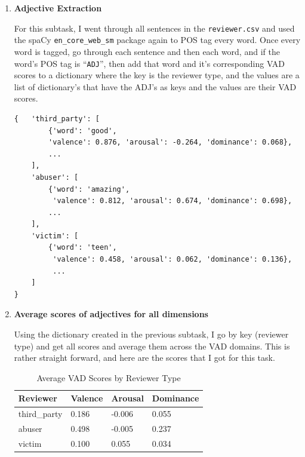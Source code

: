 \documentclass[12pt]{article}
\begin{document}
\begin{enumerate}
    \item \textbf{Adjective Extraction}
    
    For this subtask, I went through all sentences in the \texttt{reviewer.csv} and used the spaCy 
    \texttt{en\_core\_web\_sm} package again to POS tag every word. Once every word is tagged, go through each 
    sentence and then each word, and if the word's POS tag is ``\texttt{ADJ}'', then add that word and it's 
    corresponding VAD scores to a dictionary where the key is the reviewer type, and the 
    values are a list of dictionary's that have the ADJ's as keys and the values are their VAD scores.

\begin{lstlisting}
{   'third_party': [
        {'word': 'good', 
        'valence': 0.876, 'arousal': -0.264, 'dominance': 0.068},
        ...
    ],
    'abuser': [
        {'word': 'amazing',
         'valence': 0.812, 'arousal': 0.674, 'dominance': 0.698}, 
        ...
    ],
    'victim': [
        {'word': 'teen',
         'valence': 0.458, 'arousal': 0.062, 'dominance': 0.136}, 
         ...
    ]
}
\end{lstlisting}

    \item \textbf{Average scores of adjectives for all dimensions}
    
    Using the dictionary created in the previous subtask, I go by key (reviewer type) and get all scores and average them
    across the VAD domains. This is rather straight forward, and here are the scores that I got for this task.

    \begin{table}[H]
        \centering
        \renewcommand{\arraystretch}{1.4}
        \begin{tabular}{p{4cm} p{3cm} p{3cm} p{3cm}}
            \toprule
            \rowcolor{tableheader}
            \color{white}\textbf{Reviewer} & \color{white}\textbf{Valence} & \color{white}\textbf{Arousal} & \color{white}\textbf{Dominance} \\
            \midrule
            \rowcolor{rowalt} third\_party & 0.186 & -0.006 & 0.055 \\
                              abuser & 0.498 & -0.005 & 0.237 \\
            \rowcolor{rowalt} victim & 0.100 & 0.055 & 0.034 \\
            \bottomrule
        \end{tabular}
        \caption{Average VAD Scores by Reviewer Type}
        \label{tab:vad-averages}
    \end{table}


\end{enumerate}
\end{document}
